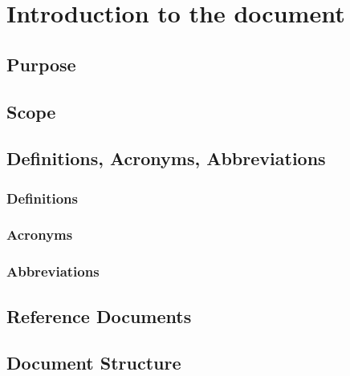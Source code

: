 \chapter{Introduction to the document}

\section{Purpose}

\section{Scope}

\section{Definitions, Acronyms, Abbreviations}
\subsection{Definitions}
\subsection{Acronyms}
\subsection{Abbreviations}

\section{Reference Documents}

\section{Document Structure}